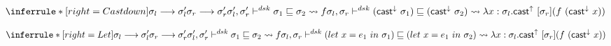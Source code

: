 \[
\inferrule*[right=Castdown]
{\sigmal \longrightarrow \sigmal' \\
\sigmar \longrightarrow \sigmar' \\
\sigmal', \sigmar' \dsk  \sigma_1 \sqsubseteq \sigma_2 \transto {f}
}
{\sigmal, \sigmar \dsk  (\castdowne \sigma_1) \sqsubseteq  (\castdowne \sigma_2)
\transto{ \lambda x:\sigmal. \castupe [\sigmar] (f\ (\castdowne x))}}
\]

\[
\inferrule*[right=Let]
{\sigmal \longrightarrow \sigmal'\\
\sigmar \longrightarrow \sigmar' \\
\sigmal', \sigmar' \dsk  \sigma_1 \sqsubseteq \sigma_2 \transto {f}
}
{\sigmal, \sigmar \dsk  (let\ x = e_1\ in\ \sigma_1) \sqsubseteq  (let\ x = e_1\ in\ \sigma_2) \\
\transto{ \lambda x:\sigmal. \castupe [\sigmar] (f\ (\castdowne x))}}
\]

\clearpage


